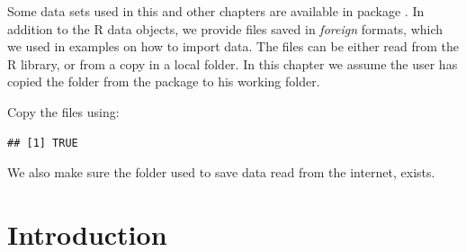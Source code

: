 \documentclass[krantz2,ChapterTOCs]{krantz}\usepackage{knitr}
\begin{document}
\begin{infobox}
Some data sets used in this and other chapters are available in package . In addition to the
R data objects, we provide files saved in \emph{foreign} formats, which we used in examples on how to import data. The files can be either read from the R library, or from a copy in a local folder. In this chapter we
assume the user has copied the folder  from the package to his working folder.

Copy the files using:

\begin{knitrout}\footnotesize
{}\color{fgcolor}\begin{kframe}
\begin{alltt}
 \hlkwb{<-} \hlstd{(}\hlstd{,}  \hlstd{=} \hlstd{)}
 \hlstd{,}  \hlstd{=} \hlstd{,}  \hlstd{=} \hlstd{)}
\end{alltt}
\begin{verbatim}
## [1] TRUE
\end{verbatim}
\end{kframe}
\end{knitrout}

We also make sure the folder used to save data read from the internet, exists.

\begin{knitrout}\footnotesize
{}\color{fgcolor}\begin{kframe}
\begin{alltt}
 \hlkwb{=} 
 \hlstd{(}\hlopt{!}
\hlstd{\}}
\end{alltt}
\end{kframe}
\end{knitrout}
\end{infobox}

\section{Introduction}
\end{document}
